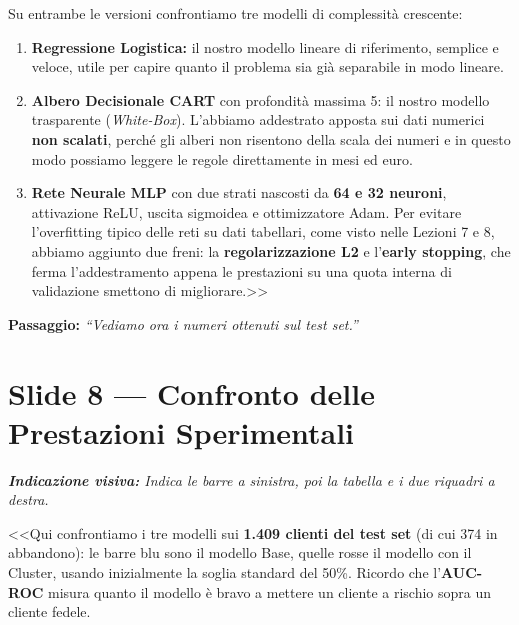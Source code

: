 \documentclass[10pt, a4paper]{article}
\newcommand{\cue}[1]{%
  \par\vspace{1pt}\noindent\colorbox{CueBg}{\parbox{\dimexpr\linewidth-2\fboxsep}{\footnotesize\textit{\color{PrimaryNavy}\textbf{Indicazione visiva:} #1}}}\par\vspace{2pt}%
}
\newcommand{\transition}[1]{%
  \par\vspace{1pt}\noindent\colorbox{LightBg}{\parbox{\dimexpr\linewidth-2\fboxsep}{\small\textbf{\color{SecondaryBlue}Passaggio:} \textit{``#1''}}}\par\vspace{2pt}%
}
\begin{document}
Su entrambe le versioni confrontiamo tre modelli di complessità crescente:
\begin{enumerate}
    \item \textbf{Regressione Logistica:} il nostro modello lineare di riferimento, semplice e veloce, utile per capire quanto il problema sia già separabile in modo lineare.
    \item \textbf{Albero Decisionale CART} con profondità massima 5: il nostro modello trasparente (\textit{White-Box}). L'abbiamo addestrato apposta sui dati numerici \textbf{non scalati}, perché gli alberi non risentono della scala dei numeri e in questo modo possiamo leggere le regole direttamente in mesi ed euro.
    \item \textbf{Rete Neurale MLP} con due strati nascosti da \textbf{64 e 32 neuroni}, attivazione ReLU, uscita sigmoidea e ottimizzatore Adam. Per evitare l'overfitting tipico delle reti su dati tabellari, come visto nelle Lezioni 7 e 8, abbiamo aggiunto due freni: la \textbf{regolarizzazione L2} e l'\textbf{early stopping}, che ferma l'addestramento appena le prestazioni su una quota interna di validazione smettono di migliorare.>>
\end{enumerate}
\transition{Vediamo ora i numeri ottenuti sul test set.}

\section*{Slide 8 --- Confronto delle Prestazioni Sperimentali}
\cue{Indica le barre a sinistra, poi la tabella e i due riquadri a destra.}
\noindent <<Qui confrontiamo i tre modelli sui \textbf{1.409 clienti del test set} (di cui 374 in abbandono): le barre blu sono il modello Base, quelle rosse il modello con il Cluster, usando inizialmente la soglia standard del 50\%. Ricordo che l'\textbf{AUC-ROC} misura quanto il modello è bravo a mettere un cliente a rischio sopra un cliente fedele.
\end{document}
